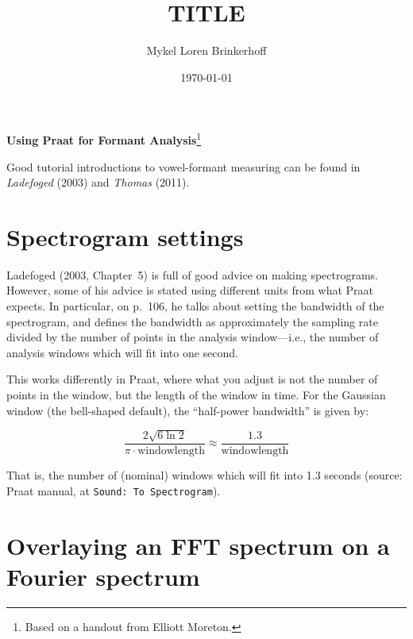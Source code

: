 \documentclass[12pt, letterpaper]{article}
\title{TITLE}
\author{Mykel Loren Brinkerhoff}
\date{\today}
\begin{document}
\begin{center}
     {\Large \textbf{Using Praat for Formant Analysis}\thanks{Based on a handout from Elliott Moreton.}}
\end{center}

Good tutorial introductions to vowel-formant measuring can be found in \textit{Ladefoged} (2003) and \textit{Thomas} (2011).

\section{Spectrogram settings}

Ladefoged (2003, Chapter~5) is full of good advice on making spectrograms. However, some of his advice is stated using different units from what Praat expects. In particular, on p.~106, he talks about setting the bandwidth of the spectrogram, and defines the bandwidth as approximately the sampling rate divided by the number of points in the analysis window—i.e., the number of analysis windows which will fit into one second. 

This works differently in Praat, where what you adjust is not the number of points in the window, but the length of the window in time. For the Gaussian window (the bell-shaped default), the “half-power bandwidth” is given by:

\[
\frac{2\sqrt{6 \ln 2}}{\pi \cdot \text{windowlength}} \approx \frac{1.3}{\text{windowlength}}
\]

That is, the number of (nominal) windows which will fit into 1.3 seconds (source: Praat manual, at \texttt{Sound: To Spectrogram}).

\section{Overlaying an FFT spectrum on a Fourier spectrum}
\end{document}
